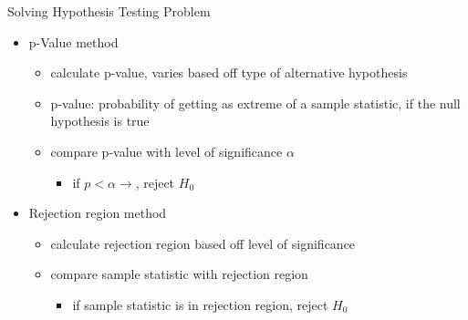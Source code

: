 \documentclass{beamer}
\begin{document}
\frame{}

\begin{frame}{Solving Hypothesis Testing Problem}
	\begin{itemize}
		\item p-Value method
		      \begin{itemize}
		      	\item calculate p-value, varies based off type of alternative hypothesis
		      	\item p-value: probability of getting as extreme of a sample statistic, if the null hypothesis is true
		      	\item compare p-value with level of significance $\alpha$
		      	      \begin{itemize}
		      	      	\item if $p<\alpha \rightarrow$, reject $H_0$
		      	      \end{itemize}
		      \end{itemize}
		\item Rejection region method
		      \begin{itemize}
		      	\item calculate rejection region based off level of significance
		      	\item compare sample statistic with rejection region
		      	      \begin{itemize}
		      	      	\item if sample statistic is in rejection region, reject $H_0$
		      	      \end{itemize}
		      \end{itemize}
	\end{itemize}
\end{frame}
\end{document}

